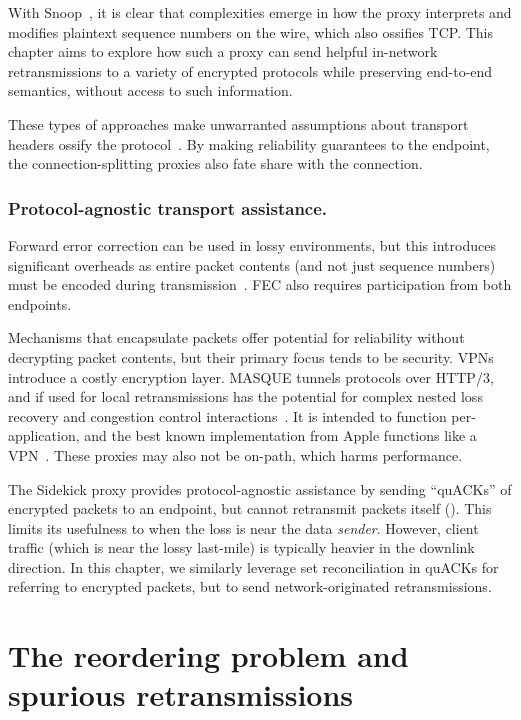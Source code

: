 With Snoop~\cite{balakrishnan1995snoop}, it is clear
that complexities emerge in how the proxy interprets
and modifies plaintext sequence numbers on the wire, which also ossifies TCP.
This chapter aims to explore how such a proxy can send helpful in-network
retransmissions to a variety of encrypted protocols while preserving
end-to-end semantics, without access to such information.

These types of approaches make unwarranted assumptions about
transport headers ossify the protocol~\cite{papastergiou2017deossifying}.
By making reliability guarantees to the endpoint, the connection-splitting
proxies also fate share with the connection.

\subsubsection{Protocol-agnostic transport assistance.}

Forward error correction can be used in lossy environments, but this
introduces significant overheads as entire packet contents (and not just
sequence numbers) must be encoded during transmission~\cite
{rfc9265}. FEC also requires participation from both endpoints.

Mechanisms that encapsulate packets offer potential for reliability without
decrypting packet contents, but their primary focus tends to be security. VPNs
introduce a costly encryption layer. MASQUE tunnels protocols over HTTP/3, and
if used for local retransmissions has the potential for complex nested loss
recovery and congestion control interactions~\cite
{rfc9298,schinazi-masque-proxy-05,kramer2021masquepep}. It is intended to
function per-application, and the best known implementation from Apple
functions like a VPN~\cite{icloud-private-relay}. These proxies may also not be
on-path, which harms performance.

The Sidekick proxy provides protocol-agnostic assistance by sending
``quACKs'' of encrypted packets to an endpoint, but cannot retransmit
packets itself (). This limits its usefulness
to when the loss is near the data \textit{sender}.
However, client traffic (which is near the lossy last-mile) is typically heavier
in the downlink direction. In this chapter, we similarly leverage set
reconciliation in quACKs for referring to encrypted packets,
but to send network-originated retransmissions.

\section{The reordering problem and spurious retransmissions}
\label{sec:packrat:problem}


